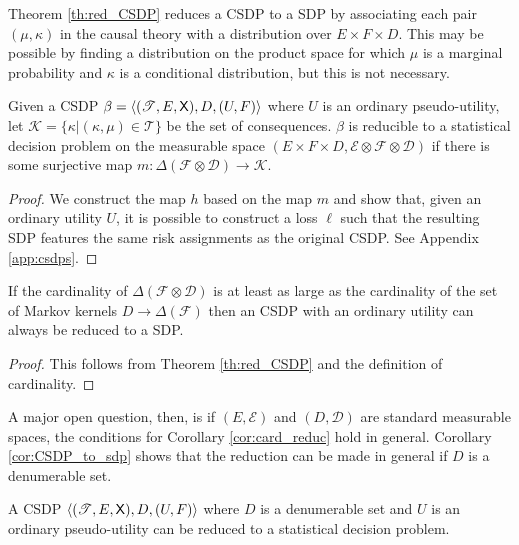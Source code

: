 Theorem \ref{th:red_CSDP} reduces a CSDP to a SDP by associating each pair $(\mu,\kappa)$ in the causal theory with a distribution over $E\times F\times D$. This may be possible by finding a distribution on the product space for which $\mu$ is a marginal probability and $\kappa$ is a conditional distribution, but this is not necessary.

\begin{theorem}\label{th:red_CSDP}
Given a CSDP $\beta=\langle (\mathscr{T},E,\mathsf{X}),D,(U,F)\rangle$ where $U$ is an ordinary pseudo-utility, let $\mathscr{K}=\{\kappa|(\kappa,\mu)\in \mathscr{T}\}$ be the set of consequences. $\beta$ is reducible to a statistical decision problem on the measurable space $(E\times F\times D,\mathcal{E}\otimes \mathcal{F}\otimes \mathcal{D})$ if there is some surjective map $m:\Delta(\mathcal{F}\otimes\mathcal{D})\to \mathscr{K}$.
\end{theorem}

\begin{proof}
We construct the map $h$ based on the map $m$ and show that, given an ordinary utility $U$, it is possible to construct a loss $\ell$ such that the resulting SDP features the same risk assignments as the original CSDP. See Appendix \ref{app:csdps}.
\end{proof}

\begin{corollary}\label{cor:card_reduc}
If the cardinality of $\Delta(\mathcal{F}\otimes\mathcal{D})$ is at least as large as the cardinality of the set of Markov kernels $D\to \Delta(\mathcal{F})$ then an CSDP with an ordinary utility can always be reduced to a SDP.
\end{corollary}

\begin{proof}
This follows from Theorem \ref{th:red_CSDP} and the definition of cardinality.
\end{proof}

A major open question, then, is if $(E,\mathcal{E})$ and $(D,\mathcal{D})$ are standard measurable spaces, the conditions for Corollary \ref{cor:card_reduc} hold in general. Corollary \ref{cor:CSDP_to_sdp} shows that the reduction can be made in general if $D$ is a denumerable set.

\begin{corollary}\label{cor:CSDP_to_sdp}
A CSDP $\langle (\mathscr{T},E,\mathsf{X}),D,(U,F)\rangle$ where $D$ is a denumerable set and  $U$ is an ordinary pseudo-utility can be reduced to a statistical decision problem.
\end{corollary}


